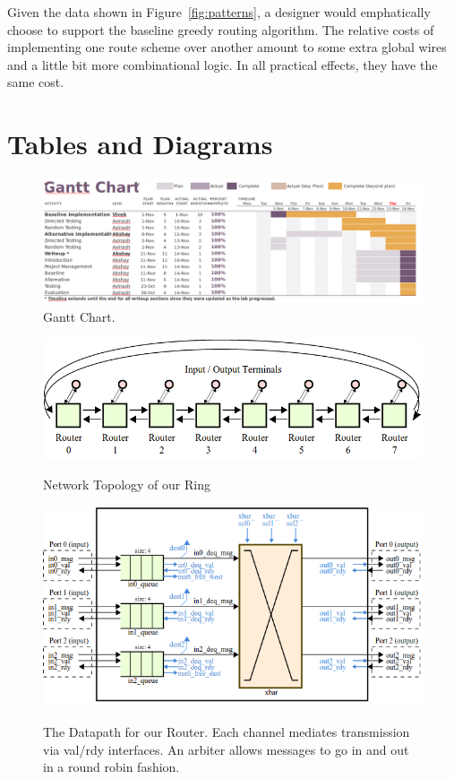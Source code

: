 \documentclass[10pt]{article}
\begin{document}
Given the data shown in Figure~\ref{fig:patterns}, a designer would
emphatically choose to support the baseline greedy routing algorithm.
The relative costs of implementing one route scheme over another amount to 
some extra global wires and a little bit more combinational logic. 
In all practical effects, they have the same cost. 


\newpage
\section {Tables and Diagrams}


\begin{figure}[h]
	\centering
	\includegraphics[scale=0.4, angle=90]{gantt}
	\caption{Gantt Chart.}
	\label{fig:gantt}
\end{figure}

\begin{figure}[h]
	\centering
	\includegraphics[scale=0.5]{topology}
	\label{fig:topo}
	\caption{Network Topology of our Ring}
\end{figure}

\begin{figure}[h]
	\centering
	\includegraphics[scale=0.7]{dpath}
	\label{fig:dpath}
	\caption
	{
		The Datapath for our Router.
		Each channel mediates transmission via val/rdy interfaces.
		An arbiter allows messages to go in and out in a round robin fashion.
	}
\end{figure}
\end{document}
